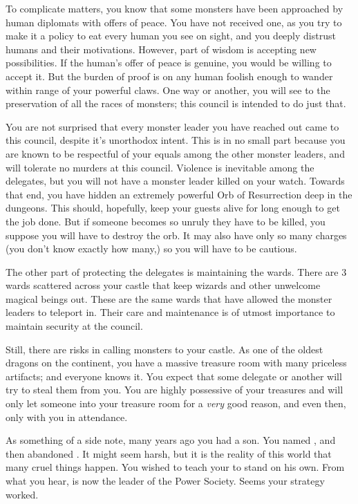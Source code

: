 \documentclass[char]{guildcamp2}
\begin{document}
To complicate matters, you know that some monsters have been approached by human diplomats with offers of peace. You have not received one, as you try to make it a policy to eat every human you see on sight, and you deeply distrust humans and their motivations. However, part of wisdom is accepting new possibilities. If the human's offer of peace is genuine, you would be willing to accept it. But the burden of proof is on any human foolish enough to wander within range of your powerful claws. One way or another, you will see to the preservation of all the races of monsters; this council is intended to do just that.

You are not surprised that every monster leader you have reached out came to this council, despite it's unorthodox intent. This is in no small part because you are known to be respectful of your equals among the other monster leaders, and will tolerate no murders at this council. Violence is inevitable among the delegates, but you will not have a monster leader killed on your watch. Towards that end, you have hidden an extremely powerful Orb of Resurrection deep in the dungeons. This should, hopefully, keep your guests alive for long enough to get the job done. But if someone becomes so unruly they have to be killed, you suppose you will have to destroy the orb. It may also have only so many charges (you don't know exactly how many,) so you will have to be cautious.

The other part of protecting the delegates is maintaining the wards. There are 3 wards scattered across your castle that keep wizards and other unwelcome magical beings out. These are the same wards that have allowed the monster leaders to teleport in. Their care and maintenance is of utmost importance to maintain security at the council.

Still, there are risks in calling monsters to your castle. As one of the oldest dragons on the continent, you have a massive treasure room with many priceless artifacts; and everyone knows it. You expect that some delegate or another will try to steal them from you. You are highly possessive of your treasures and will only let someone into your treasure room for a \emph{very} good reason, and even then, only with you in attendance.
	
As something of a side note, many years ago you had a son. You named \cRed{\them} \cRed{}, and then abandoned \cRed{\them}. It might seem harsh, but it is the reality of this world that many cruel things happen. You wished to teach your \cRed{\offspring} to stand on his own. From what you hear, \cRed{\they} is now the leader of the Power Society. Seems your strategy worked.
\end{document}
